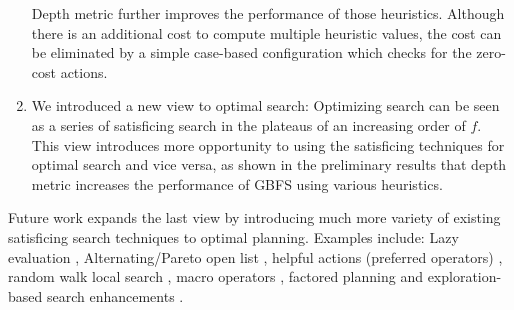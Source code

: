 \begin{enumerate}
       Depth metric further improves the performance of those
       heuristics. Although there is an additional cost to compute
       multiple heuristic values, the cost can be eliminated by a simple
       case-based configuration which checks for the zero-cost actions.
 \item We introduced a new view to optimal \astar search: Optimizing search can be seen as a series of satisficing
       search in the plateaus of an increasing order of $f$. This view introduces more opportunity to using the
       satisficing techniques for optimal search and vice versa, as shown in the preliminary results that depth
       metric increases the performance of GBFS using various heuristics.
\end{enumerate}

Future work expands the last view by introducing much more variety of
existing satisficing search techniques to optimal planning. Examples
include: Lazy evaluation \cite{richter2010lama}, Alternating/Pareto open
list \cite{RogerH10}, helpful actions (preferred operators) \cite{Hoffmann01},
random walk local search \cite{nakhost2009monte}, macro operators
\cite{Botea2005,ChrpaVM15}, factored planning
\cite{amir2003factored,brafman2006factored,Asai2015} and
exploration-based search enhancements
\cite{valenzano2014comparison,xie14type,Valenzano2016}.

